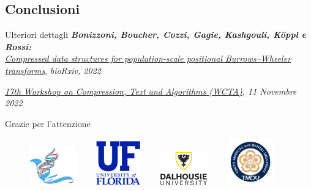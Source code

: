 \documentclass[]{beamer}
\begin{document}
\subsection{Conclusioni}
\begin{frame}{}
  \begin{block}{Ulteriori dettagli}
    \footnotesize{\textit{\textbf{Bonizzoni, Boucher, Cozzi, Gagie, Kashgouli,
          K\"{o}ppl e Rossi:} \\\underline{Compressed data structures for
          population-scale positional Burrows--Wheeler transforms}},
      \textit{bioRxiv, 2022}} 
  \end{block}
  \begin{block}{}
    \footnotesize{\textit{\underline{17th Workshop on Compression, Text and
          Algorithms (WCTA)}, 11 Novembre 2022}}  
  \end{block}
  \begin{alertblock}{}
    \begin{center}
       {\LARGE{Grazie per l'attenzione}}
    \end{center}
  \end{alertblock}
  \vspace{-0.2cm}
  \begin{figure}[H]
    \centering
    \includegraphics[width = 0.18\textwidth]{img/logo-bias.pdf}$\quad\quad$
    \includegraphics[width = 0.17\textwidth]{img/ufl.png}$\quad\quad$
    \includegraphics[width = 0.18\textwidth]{img/dal.png}$\quad\quad$
    \includegraphics[width = 0.18\textwidth]{img/tmdu.jpg}
  \end{figure}
\end{frame}
\appendix
\begin{frame}[plain]{}

\end{frame}
\end{document}
